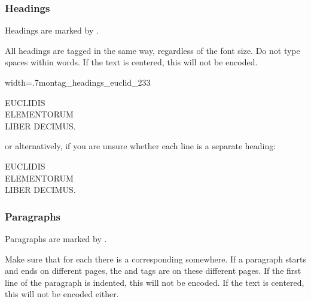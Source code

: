 \subsubsection{Headings}
\label{section headings}

\begin{mainrule}
Headings are marked by .
\end{mainrule}

\begin{clarification}
All headings are tagged in the same way, regardless of the font size. Do not type spaces within words. If the text is centered, this will not be encoded.
\end{clarification}

\begin{sampleImageSmall}{width=.7\linewidth}{montag_headings_euclid_233}
\begin{typeLatin}
EUCLIDIS \\
ELEMENTORUM \\
LIBER DECIMUS.
\end{typeLatin}
or alternatively, if you are unsure whether each line is a separate heading:
\begin{typeLatin}
EUCLIDIS \\
ELEMENTORUM \\
LIBER DECIMUS.
\end{typeLatin}
\end{sampleImageSmall}


\subsubsection{Paragraphs}
\label{section paragraphs}

\begin{mainrule}
Paragraphs are marked by .
\end{mainrule}

\begin{clarification}
Make sure that for each  there is a corresponding  somewhere. If a paragraph starts and ends on different pages, the  and  tags are on these different pages.
If the first line of the paragraph is indented, this will not be encoded. If the text is centered, this will not be encoded either.
\end{clarification}


